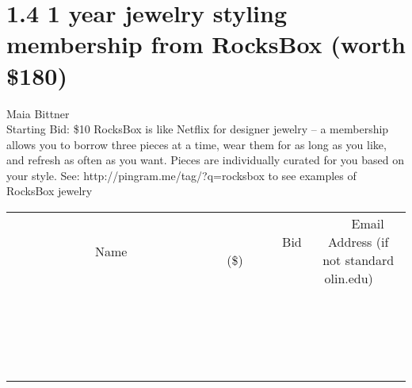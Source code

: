 \documentclass[11pt]{article}
\begin{document}
\section*{1.4 1 year jewelry styling membership from RocksBox (worth \$180)}
Maia Bittner
\\
Starting Bid: \$10
\newline
RocksBox is like Netflix for designer jewelry -- a membership allows you to borrow three pieces at a time, wear them for as long as you like, and refresh as often as you want. Pieces are individually curated for you based on your style. See: http://pingram.me/tag/?q=rocksbox to see examples of RocksBox jewelry
\\[3ex]
\begin{tabular}{c c c}
~~~~~~~~~~~~~Name~~~~~~~~~~~~~ & ~~~~~~~~~Bid (\$)~~~~~~~~~  & ~~~Email Address (if not standard olin.edu)~~~\\
 & & \\
\hline
 & & \\
\hline
 & & \\
\hline
 & & \\
\hline
 & & \\
\hline
 & & \\
\hline
 & & \\
\hline
 & & \\
\hline
 & & \\
\hline
 & & \\
\hline
 & & \\
\hline
 & & \\
\hline
 & & \\
\hline
 & & \\
\hline
 & & \\
\hline
 & & \\
\hline
 & & \\
\hline
 & & \\
\hline
 & & \\
\hline
\end{tabular}
\newpage
\end{document}
